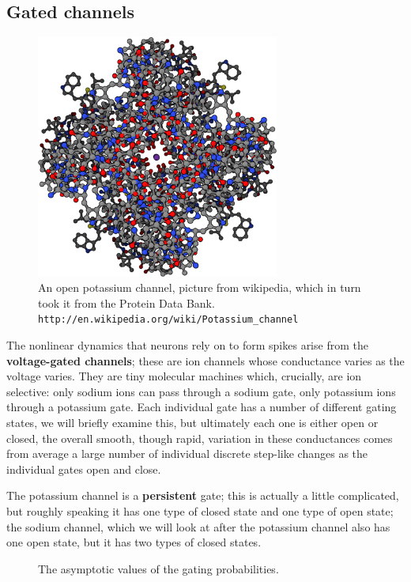 \documentclass[11pt,a4paper]{scrartcl}
\begin{document}
\subsection*{Gated channels}

\begin{figure}
\begin{center}
\includegraphics[width=8cm]{potassium_channel.png}
\end{center}
\caption{An open potassium channel, picture from  wikipedia, which in turn took it from the Protein Data Bank. \texttt{http://en.wikipedia.org/wiki/Potassium\_channel}}
\end{figure}

The nonlinear dynamics that neurons rely on to form spikes arise from
the \textbf{voltage-gated channels}; these are ion channels whose
conductance varies as the voltage varies. They are tiny molecular
machines which, crucially, are ion selective: only sodium ions can
pass through a sodium gate, only potassium ions through a potassium
gate. Each individual gate has a number of different gating states, we
will briefly examine this, but ultimately each one is either open or
closed, the overall smooth, though rapid, variation in these
conductances comes from average a large number of individual discrete
step-like changes as the individual gates open and close.

The potassium channel is a \textbf{persistent} gate; this is actually
a little complicated, but roughly speaking it has one type of closed
state and one type of open state; the sodium channel, which we will
look at after the potassium channel also has one open state, but it
has two types of closed states. 

\begin{figure}
\begin{center}

\end{center}
\caption{The asymptotic values of the gating probabilities.\label{fig:asymp_vals}}
\end{figure}
\end{document}
